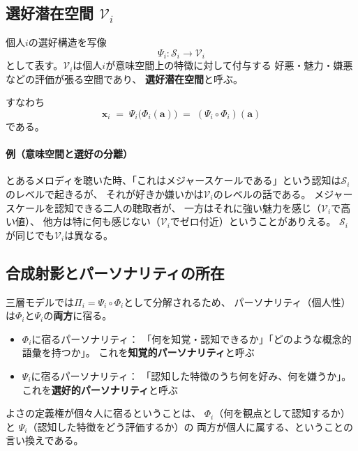 \documentclass[a4paper, fontsize=10pt]{jlreq}
\newcommand{\vx}{\bm{x}}
\newcommand{\va}{\bm{a}}
\newcommand{\Si}{\mathcal{S}_i}
\newcommand{\Vi}{\mathcal{V}_i}
\newcommand{\Phii}{\Phi_i}
\newcommand{\Psii}{\Psi_i}
\begin{document}
\subsection{選好潜在空間 $\Vi$}

個人$i$の選好構造を写像
\begin{equation}
  \Psii : \Si \longrightarrow \Vi
\end{equation}
として表す。$\Vi$は個人$i$が意味空間上の特徴に対して付与する
好悪・魅力・嫌悪などの評価が張る空間であり、
\textbf{選好潜在空間}と呼ぶ。

すなわち
\begin{equation}
  \vx_i \;=\; \Psii\bigl(\Phii(\va)\bigr)
      \;=\; (\Psii \circ \Phii)(\va)
\end{equation}
である。

\paragraph{例（意味空間と選好の分離）}
とあるメロディを聴いた時、「これはメジャースケールである」という認知は$\Si$のレベルで起きるが、
それが好きか嫌いかは$\Vi$のレベルの話である。
メジャースケールを認知できる二人の聴取者が、
一方はそれに強い魅力を感じ（$\Vi$で高い値）、
他方は特に何も感じない（$\Vi$でゼロ付近）ということがありえる。
$\Si$が同じでも$\Vi$は異なる。

\subsection{合成射影とパーソナリティの所在}

三層モデルでは$\Pi_i = \Psii \circ \Phii$として分解されるため、
パーソナリティ（個人性）は$\Phii$と$\Psii$の\textbf{両方}に宿る。

\begin{itemize}[leftmargin=2em]
  \item $\Phii$に宿るパーソナリティ：
    「何を知覚・認知できるか」「どのような概念的語彙を持つか」。
    これを\textbf{知覚的パーソナリティ}と呼ぶ
  \item $\Psii$に宿るパーソナリティ：
    「認知した特徴のうち何を好み、何を嫌うか」。
    これを\textbf{選好的パーソナリティ}と呼ぶ
\end{itemize}

よさの定義権が個々人に宿るということは、
$\Phii$（何を観点として認知するか）と
$\Psii$（認知した特徴をどう評価するか）の
両方が個人に属する、ということの言い換えである。
\end{document}
